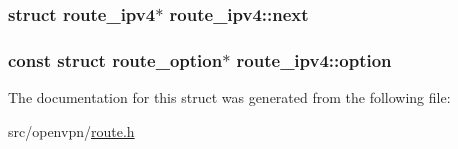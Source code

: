 \subsubsection[{next}]{\setlength{\rightskip}{0pt plus 5cm}struct {\bf route\+\_\+ipv4}$\ast$ route\+\_\+ipv4\+::next}\label{structroute__ipv4_a49d3bfec5422f032e85505762ed45507}
\hypertarget{structroute__ipv4_a0423e77fc01b5bc05771824d51740fe3}{}
\subsubsection[{option}]{\setlength{\rightskip}{0pt plus 5cm}const struct {\bf route\+\_\+option}$\ast$ route\+\_\+ipv4\+::option}\label{structroute__ipv4_a0423e77fc01b5bc05771824d51740fe3}


The documentation for this struct was generated from the following file\+:\begin{DoxyCompactItemize}
\item 
src/openvpn/\hyperlink{route_8h}{route.\+h}\end{DoxyCompactItemize}
